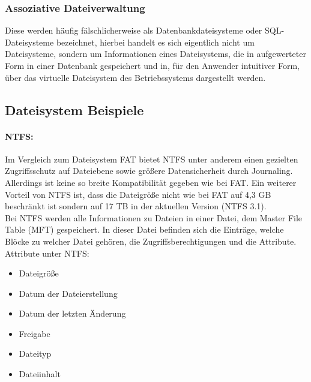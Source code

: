 \subsubsection{Assoziative Dateiverwaltung}
Diese werden häufig fälschlicherweise als Datenbankdateisysteme oder SQL-Dateisysteme bezeichnet, hierbei handelt es sich eigentlich nicht um Dateisysteme, sondern um Informationen eines Dateisystems, die in aufgewerteter Form in einer Datenbank gespeichert und in, für den Anwender intuitiver Form, über das virtuelle Dateisystem des Betriebssystems dargestellt werden.
\subsection{Dateisystem Beispiele}
\paragraph{NTFS:} Im Vergleich zum Dateisystem FAT bietet NTFS unter anderem einen gezielten Zugriffsschutz auf Dateiebene sowie größere Datensicherheit durch Journaling. Allerdings ist keine so breite Kompatibilität gegeben wie bei FAT. Ein weiterer Vorteil von NTFS ist, dass die Dateigröße nicht wie bei FAT auf 4,3 GB beschränkt ist sondern auf 17 TB in der aktuellen Version (NTFS 3.1).\\[3mm]
Bei NTFS werden alle Informationen zu Dateien in einer Datei, dem Master File Table (MFT) gespeichert. In dieser Datei befinden sich die Einträge, welche Blöcke zu welcher Datei gehören, die Zugriffsberechtigungen und die Attribute.\\
Attribute unter NTFS:
\begin{itemize}
	\item Dateigröße
	\item Datum der Dateierstellung
	\item Datum der letzten Änderung
	\item Freigabe
	\item Dateityp 
	\item Dateiinhalt
\end{itemize}

